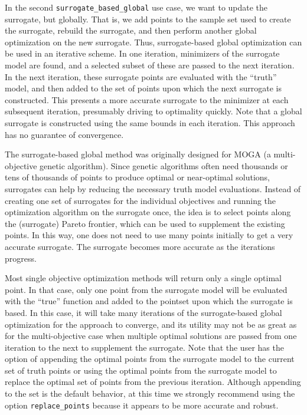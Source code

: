 In the second \texttt{surrogate\_based\_global} use case, we want to
update the surrogate, but globally.  That is, we add points to the
sample set used to create the surrogate, rebuild the surrogate, and
then perform another global optimization on the new surrogate.  Thus,
surrogate-based global optimization can be used in an iterative
scheme.  In one iteration, minimizers of the surrogate model are
found, and a selected subset of these are passed to the next
iteration.  In the next iteration, these surrogate points are
evaluated with the ``truth'' model, and then added to the set of
points upon which the next surrogate is constructed.  This presents a
more accurate surrogate to the minimizer at each subsequent iteration,
presumably driving to optimality quickly.  Note that a global
surrogate is constructed using the same bounds in each iteration.
This approach has no guarantee of convergence.

The surrogate-based global method was originally designed for MOGA (a
multi-objective genetic algorithm).  Since genetic algorithms often
need thousands or tens of thousands of points to produce optimal or
near-optimal solutions, surrogates can help by reducing the necessary
truth model evaluations.  Instead of creating one set of surrogates
for the individual objectives and running the optimization algorithm
on the surrogate once, the idea is to select points along the
(surrogate) Pareto frontier, which can be used to supplement the
existing points.  In this way, one does not need to use many points
initially to get a very accurate surrogate.  The surrogate becomes
more accurate as the iterations progress.

Most single objective optimization methods will return only a single
optimal point.  In that case, only one point from the surrogate model
will be evaluated with the ``true'' function and added to the pointset
upon which the surrogate is based.  In this case, it will take many
iterations of the surrogate-based global optimization for the approach
to converge, and its utility may not be as great as for the
multi-objective case when multiple optimal solutions are passed from
one iteration to the next to supplement the surrogate.  Note that the
user has the option of appending the optimal points from the surrogate
model to the current set of truth points or using the optimal points
from the surrogate model to replace the optimal set of points from the
previous iteration.  Although appending to the set is the default
behavior, at this time we strongly recommend using the option
\texttt{replace\_points} because it appears to be more accurate and
robust.

